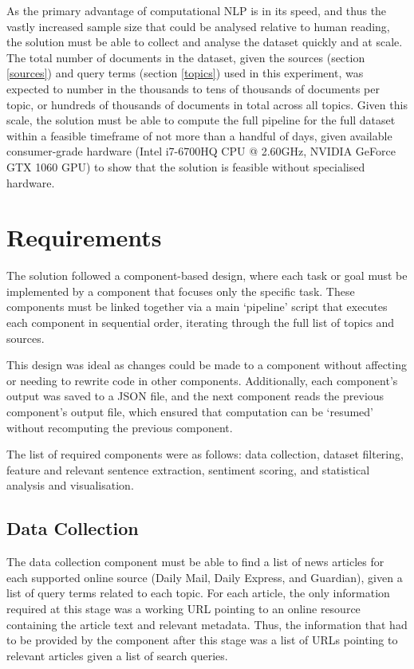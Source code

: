 \documentclass{report}
\begin{document}
As the primary advantage of computational NLP is in its speed, and thus the vastly increased sample size that could be analysed relative to human reading, the solution must be able to collect and analyse the dataset quickly and at scale.
The total number of documents in the dataset, given the sources (section \ref{sources}) and query terms (section \ref{topics}) used in this experiment, was expected to number in the thousands to tens of thousands of documents per topic, or hundreds of thousands of documents in total across all topics.
Given this scale, the solution must be able to compute the full pipeline for the full dataset within a feasible timeframe of not more than a handful of days, given available consumer-grade hardware (Intel i7-6700HQ CPU @ 2.60GHz, NVIDIA GeForce GTX 1060 GPU) to show that the solution is feasible without specialised hardware.

\section{Requirements} \label{Requirements}

The solution followed a component-based design, where each task or goal must be implemented by a component that focuses only the specific task.
These components must be linked together via a main `pipeline' script that executes each component in sequential order, iterating through the full list of topics and sources.

This design was ideal as changes could be made to a component without affecting or needing to rewrite code in other components.
Additionally, each component's output was saved to a JSON \cite{rfc8259} file, and the next component reads the previous component's output file, which ensured that computation can be `resumed' without recomputing the previous component.

The list of required components were as follows: data collection, dataset filtering, feature and relevant sentence extraction, sentiment scoring, and statistical analysis and visualisation.


\subsection{Data Collection} \label{req-data-collection}  %

The data collection component must be able to find a list of news articles for each supported online source (Daily Mail, Daily Express, and Guardian), given a list of query terms related to each topic.
For each article, the only information required at this stage was a working URL pointing to an online resource containing the article text and relevant metadata.
Thus, the information that had to be provided by the component after this stage was a list of URLs pointing to relevant articles given a list of search queries.
\end{document}
